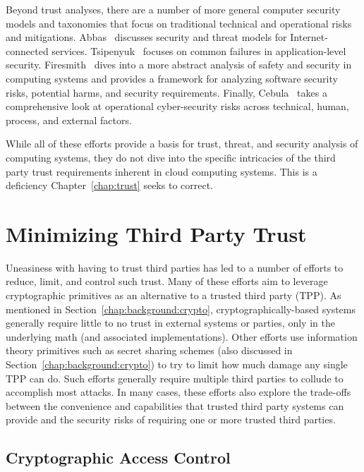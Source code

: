 Beyond trust analyses, there are a number of more general computer
security models and taxonomies that focus on traditional technical and
operational risks and mitigations. Abbas~\cite{abbas2005} discusses
security and threat models for Internet-connected services.
Tsipenyuk~\cite{tsipenyuk2005} focuses on common failures in
application-level security. Firesmith~\cite{firesmith2005} dives into
a more abstract analysis of safety and security in computing systems
and provides a framework for analyzing software security risks,
potential harms, and security requirements. Finally,
Cebula~\cite{cebula2010} takes a comprehensive look at operational
cyber-security risks across technical, human, process, and external
factors.

While all of these efforts provide a basis for trust, threat, and
security analysis of computing systems, they do not dive into the
specific intricacies of the third party trust requirements inherent in
cloud computing systems. This is a deficiency Chapter~\ref{chap:trust}
seeks to correct.

\section{Minimizing Third Party Trust}
\label{chap:related:minimize}

Uneasiness with having to trust third parties has led to a number of
efforts to reduce, limit, and control such trust. Many of these
efforts aim to leverage cryptographic primitives as an alternative to
a trusted third party (TPP). As mentioned in
Section~\ref{chap:background:crypto}, cryptographically-based systems
generally require little to no trust in external systems or parties,
only in the underlying math (and associated implementations). Other
efforts use information theory primitives such as secret sharing
schemes (also discussed in Section~\ref{chap:background:crypto}) to
try to limit how much damage any single TPP can do. Such efforts
generally require multiple third parties to collude to accomplish most
attacks. In many cases, these efforts also explore the trade-offs
between the convenience and capabilities that trusted third party
systems can provide and the security risks of requiring one or more
trusted third parties.

\subsection{Cryptographic Access Control}


